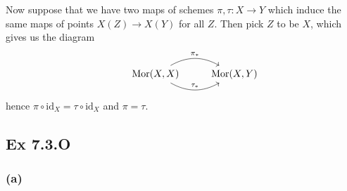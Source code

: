 \documentclass{article}
\theoremstyle{definition}
\newcommand{\Mor}{\text{Mor}}
\newcommand{\id}{\text{id}}
\begin{document}
Now suppose that we have two maps of schemes $\pi, \tau : X \to Y$ which
induce the same maps of points $X(Z) \to X(Y)$ for all $Z$. Then pick $Z$
to be $X$, which gives us the diagram
\[
	\begin{tikzcd}
		& \Mor(X, X)
		\ar[r, bend left=30, "\pi_{*}"]
		\ar[r, bend right=30, "\tau_{*}"]
		& \Mor(X, Y)
	\end{tikzcd}
\]
hence $\pi \circ \id_X = \tau \circ \id_X$ and $\pi = \tau$.

\subsection*{Ex 7.3.O}

\subsubsection*{(a)}
\end{document}
